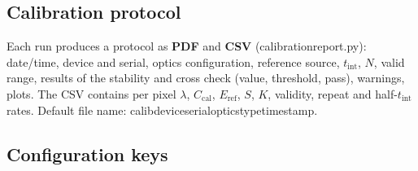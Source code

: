 \documentclass[12pt,a4paper]{article}
\DeclareRobustCommand{\file}[1]{{\ttfamily\small\def\_{\rawus\allowbreak}#1}}
\begin{document}
\subsection{Calibration protocol}
Each run produces a protocol as \textbf{PDF} and \textbf{CSV}
(\file{calibration\_report.py}): date/time, device and serial, optics
configuration, reference source, $t_{\mathrm{int}}$, $N$, valid range, results of
the stability and cross check (value, threshold, pass), warnings, plots.
The CSV contains per pixel $\lambda$, $C_{\mathrm{cal}}$, $E_{\mathrm{ref}}$, $S$,
$K$, validity, repeat and half-$t_{\mathrm{int}}$ rates. Default file name:
\file{calib\_device\_serial\_optics\_type\_timestamp}.

\subsection{Configuration keys}
\end{document}
